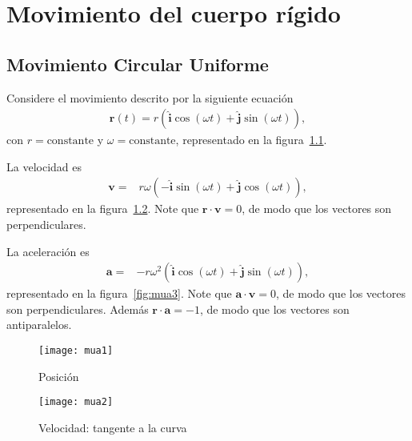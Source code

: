 
\chapter{Movimiento del cuerpo rígido}

\section{Movimiento Circular Uniforme}

Considere el movimiento descrito por la siguiente ecuaci\'on
\begin{align}
  \label{eq:mua}
  \mathbf{r}(t)=r\left(\hat{\mathbf{i}}\cos(\omega t)+\hat{\mathbf{j}}\sin(\omega t)\right),
\end{align}
con $r=\text{constante}$ y $\omega=\text{constante}$, representado en la figura~\ref{fig:mua1}.

La velocidad es
\begin{align}
  \mathbf{v}=&%
  r\omega\left(-\hat{\mathbf{i}}\sin(\omega t)+\hat{\mathbf{j}}\cos(\omega t)\right),
\end{align}
representado en la figura~\ref{fig:mua2}. Note que $\mathbf{r}\cdot\mathbf{v}=0$, de modo que los vectores son perpendiculares.

La aceleraci\'on es
\begin{align}
  \mathbf{a}=&%
  -r\omega^2\left(\hat{\mathbf{i}}\cos(\omega t)+\hat{\mathbf{j}}\sin(\omega t)\right),
\end{align}
representado en la figura~\ref{fig:mua3}. Note que $\mathbf{a}\cdot\mathbf{v}=0$, de modo que los vectores son perpendiculares. Adem\'as
$\mathbf{r}\cdot\mathbf{a}=-1$, de modo que los vectores son antiparalelos.


\begin{frame}
  \begin{figure}
    \centering
    \texttt{[image: mua1]}    
    \caption{Posici\'on}
    \label{fig:mua1}
  \end{figure}

\end{frame}
\begin{frame}
  \begin{figure}
    \centering
    \texttt{[image: mua2]}    
    \caption{Velocidad: tangente a la curva}
    \label{fig:mua2}
  \end{figure}
\end{frame}

